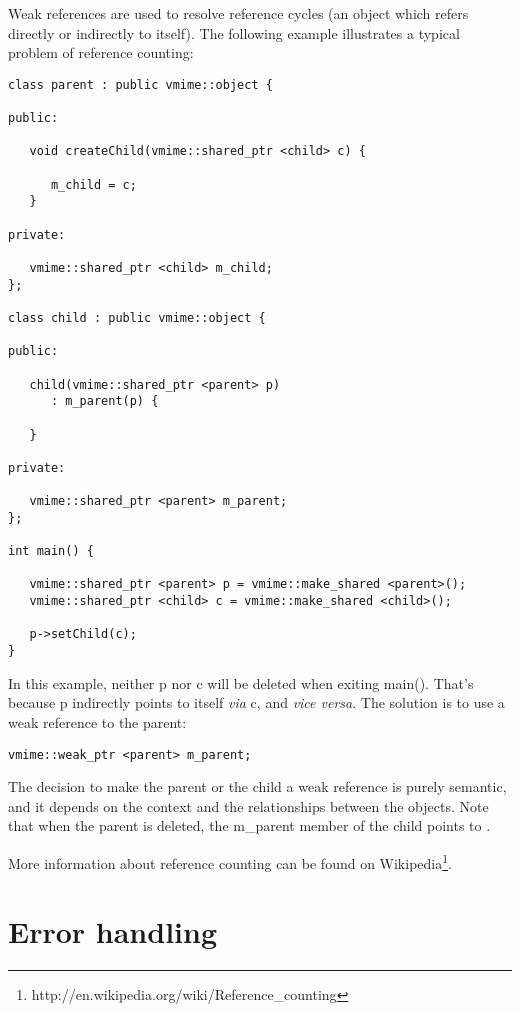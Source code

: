Weak references are used to resolve reference cycles (an object which refers
directly or indirectly to itself). The following example illustrates a
typical problem of reference counting:

\begin{lstlisting}
class parent : public vmime::object {

public:

   void createChild(vmime::shared_ptr <child> c) {

      m_child = c;
   }

private:

   vmime::shared_ptr <child> m_child;
};

class child : public vmime::object {

public:

   child(vmime::shared_ptr <parent> p)
      : m_parent(p) {

   }

private:

   vmime::shared_ptr <parent> m_parent;
};

int main() {

   vmime::shared_ptr <parent> p = vmime::make_shared <parent>();
   vmime::shared_ptr <child> c = vmime::make_shared <child>();

   p->setChild(c);
}
\end{lstlisting}

In this example, neither {\vcode p} nor {\vcode c} will be deleted when
exiting {\vcode main()}. That's because {\vcode p} indirectly points to itself
{\em via} {\vcode c}, and {\em vice versa}. The solution is to use a weak
reference to the parent:

\begin{lstlisting}
vmime::weak_ptr <parent> m_parent;
\end{lstlisting}

The decision to make the parent or the child a weak reference is purely
semantic, and it depends on the context and the relationships between the
objects. Note that when the parent is deleted, the {\vcode m\_parent} member
of the child points to \vnull.

More information about reference counting can be found on
Wikipedia\footnote{http://en.wikipedia.org/wiki/Reference\_counting}.

\section{Error handling}

